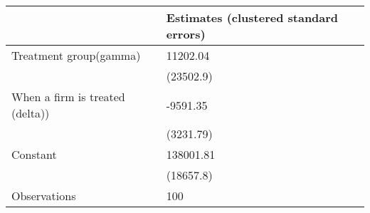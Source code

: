 \begin{tabular}{ll}
\toprule
{} & Estimates (clustered standard errors) \\
\midrule
Treatment group(gamma)          &                              11202.04 \\
                                &                             (23502.9) \\
When a firm is treated (delta)) &                              -9591.35 \\
                                &                             (3231.79) \\
Constant                        &                             138001.81 \\
                                &                             (18657.8) \\
Observations                    &                                   100 \\
\bottomrule
\end{tabular}
